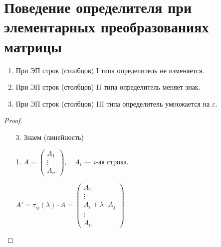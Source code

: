 \section{Поведение определителя при элементарных преобразованиях матрицы}

\begin{theorem-non}

    \begin{enumerate}
        \item При ЭП строк (столбцов) I типа определитель не изменяется.
        \item При ЭП строк (столбцов) II типа определитель меняет знак.
        \item При ЭП строк (столбцов) III типа определитель умножается на $\varepsilon$.
    \end{enumerate}

    \begin{proof} $\quad$ \\
        \begin{enumerate}
            \item[3.] Знаем (линейность)
            \item[1.]
            $A =
            \begin{pmatrix}
                A_1 \\
                \vdots \\
                A_n
            \end{pmatrix}, \quad A_i$ --- $i$-ая строка.
            
            $A' = \tau_{ij}(\lambda) \cdot A = 
            \begin{pmatrix}
                A_1 \\
                \vdots \\
                A_i + \lambda \cdot A_j \\
                \vdots \\
                A_n
            \end{pmatrix}$


\end{enumerate}
\end{proof}
\end{theorem-non}
